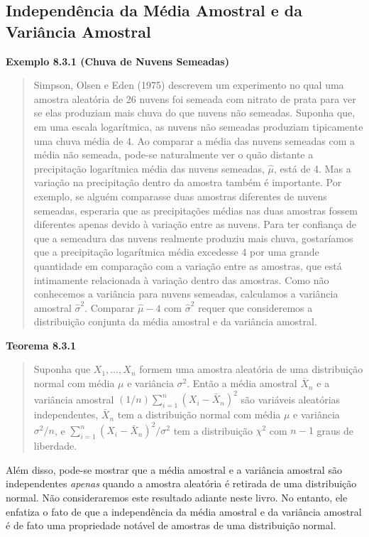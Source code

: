 \subsection*{Independência da Média Amostral e da Variância Amostral}

\vspace{1em}
\noindent\textbf{Exemplo 8.3.1 (Chuva de Nuvens Semeadas)}
\begin{quote}
    Simpson, Olsen e Eden (1975) descrevem um experimento no qual uma amostra aleatória de 26 nuvens foi semeada com nitrato de prata para ver se elas produziam mais chuva do que nuvens não semeadas. Suponha que, em uma escala logarítmica, as nuvens não semeadas produziam tipicamente uma chuva média de 4. Ao comparar a média das nuvens semeadas com a média não semeada, pode-se naturalmente ver o quão distante a precipitação logarítmica média das nuvens semeadas, $\hat{\mu}$, está de 4. Mas a variação na precipitação dentro da amostra também é importante. Por exemplo, se alguém comparasse duas amostras diferentes de nuvens semeadas, esperaria que as precipitações médias nas duas amostras fossem diferentes apenas devido à variação entre as nuvens. Para ter confiança de que a semeadura das nuvens realmente produziu mais chuva, gostaríamos que a precipitação logarítmica média excedesse 4 por uma grande quantidade em comparação com a variação entre as amostras, que está intimamente relacionada à variação dentro das amostras. Como não conhecemos a variância para nuvens semeadas, calculamos a variância amostral $\hat{\sigma}^2$. Comparar $\hat{\mu}-4$ com $\hat{\sigma}^2$ requer que consideremos a distribuição conjunta da média amostral e da variância amostral.
\end{quote}
\vspace{1em}

\vspace{1em}
\noindent\textbf{Teorema 8.3.1}
\begin{quote}
    Suponha que $X_1, \dots, X_n$ formem uma amostra aleatória de uma distribuição normal com média $\mu$ e variância $\sigma^2$. Então a média amostral $\bar{X}_n$ e a variância amostral $(1/n)\sum_{i=1}^{n}(X_i - \bar{X}_n)^2$ são variáveis aleatórias independentes, $\bar{X}_n$ tem a distribuição normal com média $\mu$ e variância $\sigma^2/n$, e $\sum_{i=1}^{n}(X_i - \bar{X}_n)^2/\sigma^2$ tem a distribuição $\chi^2$ com $n-1$ graus de liberdade.
\end{quote}
\vspace{1em}

Além disso, pode-se mostrar que a média amostral e a variância amostral são independentes \textit{apenas} quando a amostra aleatória é retirada de uma distribuição normal. Não consideraremos este resultado adiante neste livro. No entanto, ele enfatiza o fato de que a independência da média amostral e da variância amostral é de fato uma propriedade notável de amostras de uma distribuição normal.

